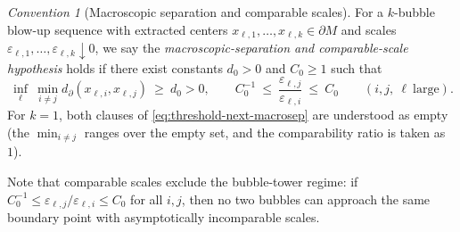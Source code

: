 \documentclass[11pt,reqno,a4paper]{amsart}
\numberwithin{equation}{section}
\theoremstyle{plain}
\theoremstyle{remark}
\newtheorem{convention}[theorem]{Convention}
\theoremstyle{plain}
\begin{document}
\begin{convention}[Macroscopic separation and comparable scales]
\label{conv:macrosep-comparable}
For a $k$-bubble blow-up sequence with extracted centers
$x_{\ell,1},\dots,x_{\ell,k}\in\partial M$ and scales
$\varepsilon_{\ell,1},\dots,\varepsilon_{\ell,k}\downarrow0$, we say
the \emph{macroscopic-separation and comparable-scale hypothesis} holds if
there exist constants $d_0>0$ and $C_0\ge1$ such that
\begin{equation}\label{eq:threshold-next-macrosep}
\inf_\ell\ \min_{i\ne j}d_\partial(x_{\ell,i},x_{\ell,j})\ \ge\ d_0>0,
\qquad
C_0^{-1}\ \le\ \frac{\varepsilon_{\ell,j}}{\varepsilon_{\ell,i}}\ \le\ C_0\qquad(i,j,\ \ell\ \text{large}).
\end{equation}
For $k=1$, both clauses of \eqref{eq:threshold-next-macrosep} are understood as
empty (the $\min_{i\ne j}$ ranges over the empty set, and the comparability
ratio is taken as~$1$).

Note that comparable scales exclude the bubble-tower regime: if
$C_0^{-1}\le\varepsilon_{\ell,j}/\varepsilon_{\ell,i}\le C_0$ for all
$i,j$, then no two bubbles can approach the same boundary point with
asymptotically incomparable scales.
\end{convention}
\end{document}
